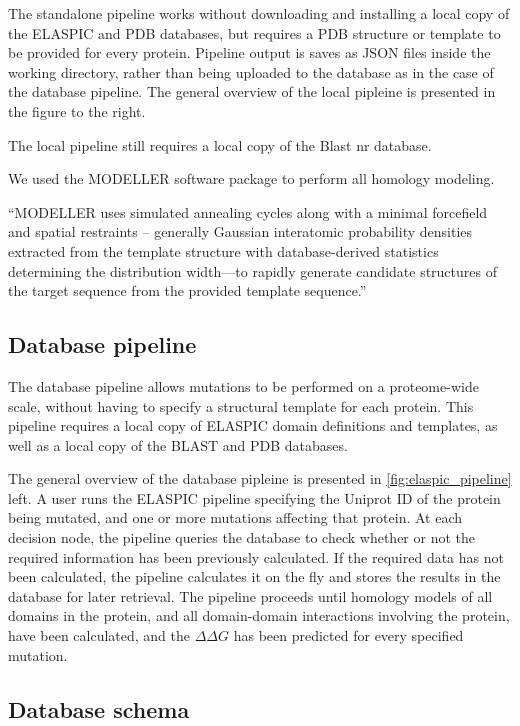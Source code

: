 The standalone pipeline works without downloading and installing a local copy of the ELASPIC and PDB databases, but requires a PDB structure or template to be provided for every protein. Pipeline output is saves as JSON files inside the working directory, rather than being uploaded to the database as in the case of the database pipeline. The general overview of the local pipleine is presented in the figure to the right.

The local pipeline still requires a local copy of the Blast nr database.

We used the MODELLER software package to perform all homology modeling.

``MODELLER uses simulated annealing cycles along with a minimal forcefield and spatial restraints -- generally Gaussian interatomic probability densities extracted from the template structure with database-derived statistics determining the distribution width—to rapidly generate candidate structures of the target sequence from the provided template sequence.''


\subsection{Database pipeline}

The database pipeline allows mutations to be performed on a proteome-wide scale, without having to specify a structural template for each protein. This pipeline requires a local copy of ELASPIC domain definitions and templates, as well as a local copy of the BLAST and PDB databases.

The general overview of the database pipleine is presented in \ref{fig:elaspic_pipeline} left. A user runs the ELASPIC pipeline specifying the Uniprot ID of the protein being mutated, and one or more mutations affecting that protein. At each decision node, the pipeline queries the database to check whether or not the required information has been previously calculated. If the required data has not been calculated, the pipeline calculates it on the fly and stores the results in the database for later retrieval. The pipeline proceeds until homology models of all domains in the protein, and all domain-domain interactions involving the protein, have been calculated, and the $\Delta \Delta G$ has been predicted for every specified mutation.


\subsection{Database schema}

